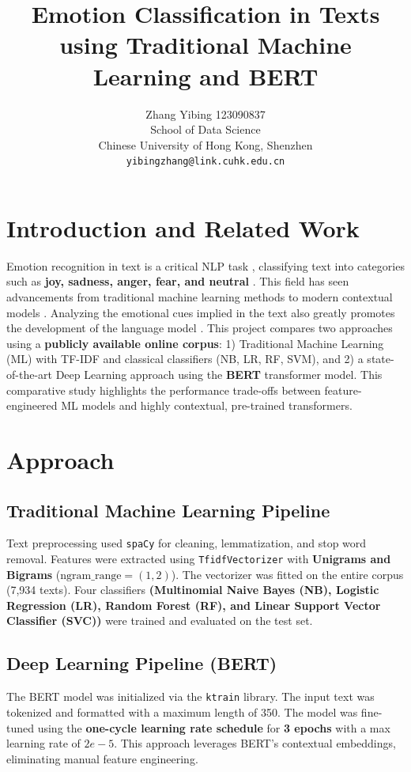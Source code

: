 \documentclass{article}
\title{
  Emotion Classification in Texts using Traditional Machine Learning and BERT \\
  \vspace{1em}
}
\author{
    Zhang Yibing 123090837\\
    School of Data Science \\
    Chinese University of Hong Kong, Shenzhen \\
  \texttt{yibingzhang@link.cuhk.edu.cn} \\
}
\begin{document}
\maketitle

\section{Introduction and Related Work}

Emotion recognition in text is a critical NLP task \cite{murthy2021}, classifying text into categories such as \textbf{joy, sadness, anger, fear, and neutral} \cite{acheampong2020}. This field has seen advancements from traditional machine learning methods to modern contextual models \cite{aman2007}. Analyzing the emotional cues implied in the text also greatly promotes the development of the language model \cite{alm2005}. This project compares two approaches using a \textbf{publicly available online corpus}: 1) Traditional Machine Learning (ML) with TF-IDF and classical classifiers (NB, LR, RF, SVM), and 2) a state-of-the-art Deep Learning approach using the \textbf{BERT} transformer model. This comparative study highlights the performance trade-offs between feature-engineered ML models and highly contextual, pre-trained transformers.

\section{Approach}
\subsection{Traditional Machine Learning Pipeline}
Text preprocessing used \texttt{spaCy} for cleaning, lemmatization, and stop word removal. Features were extracted using \texttt{TfidfVectorizer} with \textbf{Unigrams and Bigrams} ($\text{ngram\_range}=(1, 2)$). The vectorizer was fitted on the entire corpus (7,934 texts). Four classifiers \textbf{(Multinomial Naive Bayes (NB), Logistic Regression (LR), Random Forest (RF), and Linear Support Vector Classifier (SVC))} were trained and evaluated on the test set.

\subsection{Deep Learning Pipeline (BERT)}
The BERT model was initialized via the \texttt{ktrain} library. The input text was tokenized and formatted with a maximum length of 350. The model was fine-tuned using the \textbf{one-cycle learning rate schedule} for \textbf{3 epochs} with a max learning rate of $2e-5$. This approach leverages BERT's contextual embeddings, eliminating manual feature engineering.
\end{document}
